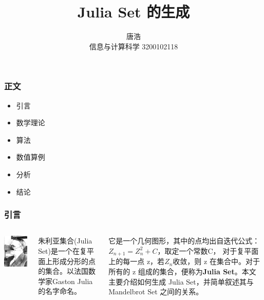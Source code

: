 \documentclass{beamer}
\begin{document}
\title{Julia Set 的生成}

\author{唐浩 \\ 信息与计算科学 3200102118}


\maketitle

\begin{frame}
  \frametitle{正文}
  \begin{itemize}
  \item 引言
  \item 数学理论
  \item 算法
  \item 数值算例
  \item 分析
  \item 结论
  \end{itemize}
\end{frame}


\begin{frame}
  \frametitle{引言}
  \begin{columns}
    \includegraphics[scale=0.2]{Julia.jpeg}

  朱利亚集合(Julia Set)是一个在复平面上形成分形的点的集合。以法国数学家Gaston Julia的名字命名。
  
  它是一个几何图形，其中的点均出自迭代公式：{\bf $Z_{n+1} = Z_n^2 + C$}，取定一个常数C， 对于复平面上的每一点 z，若$Z_n$收敛，则 z 在集合中。对于所有的 z 组成的集合，便称为{\bf Julia Set}。本文主要介绍如何生成 Julia Set，并简单叙述其与 Mandelbrot Set 之间的关系。
  \end{columns}
\end{frame}
\end{document}
